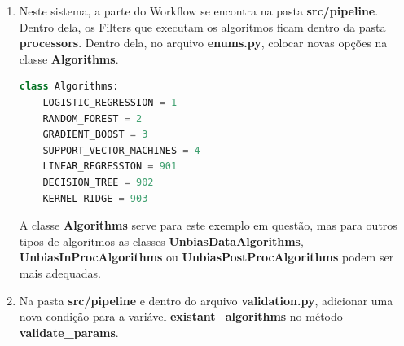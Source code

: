 \documentclass[portugues]{ic-tese}
\begin{document}
\begin{enumerate}
\item Neste sistema, a parte do Workflow se encontra na pasta \textbf{src/pipeline}. Dentro dela, os Filters que executam os algoritmos ficam dentro da pasta \textbf{processors}. Dentro dela, no arquivo \textbf{enums.py}, colocar novas opções na classe \textbf{Algorithms}.

\begin{lstlisting}[language=Python, label=cod:EnumAlgorithmOptions]
class Algorithms:
    LOGISTIC_REGRESSION = 1
    RANDOM_FOREST = 2
    GRADIENT_BOOST = 3
    SUPPORT_VECTOR_MACHINES = 4
    LINEAR_REGRESSION = 901
    DECISION_TREE = 902
    KERNEL_RIDGE = 903
\end{lstlisting}

A classe \textbf{Algorithms} serve para este exemplo em questão, mas para outros tipos de algoritmos as classes \textbf{UnbiasDataAlgorithms}, \textbf{UnbiasInProcAlgorithms} ou \textbf{UnbiasPostProcAlgorithms} podem ser mais adequadas.

\item Na pasta \textbf{src/pipeline} e dentro do arquivo \textbf{validation.py}, adicionar uma nova condição para a variável \textbf{existant\_algorithms} no método \textbf{validate\_params}.


\end{enumerate}
\end{document}
